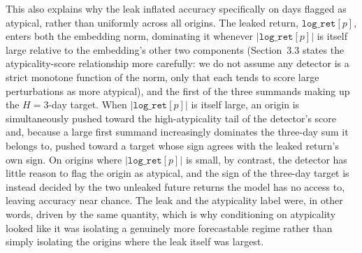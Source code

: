 \documentclass[preprint,12pt]{elsarticle}
\begin{document}
This also explains why the leak inflated accuracy specifically on days flagged as atypical,
rather than uniformly across all origins. The leaked return, $\texttt{log\_ret}[p]$, enters both
the embedding norm, dominating it whenever $|\texttt{log\_ret}[p]|$ is itself large relative to
the embedding's other two components (Section~3.3 states the atypicality-score relationship more
carefully: we do not assume any detector is a strict monotone function of the norm, only that
each tends to score large perturbations as more atypical), and the first of the three
summands making up the $H=3$-day target. When $|\texttt{log\_ret}[p]|$ is itself large, an origin
is simultaneously pushed toward the high-atypicality tail of the detector's score and, because a
large first summand increasingly dominates the three-day sum it belongs to, pushed toward a
target whose sign agrees with the leaked return's own sign. On origins where
$|\texttt{log\_ret}[p]|$ is small, by contrast, the detector has little reason to flag the origin
as atypical, and the sign of the three-day target is instead decided by the two unleaked future
returns the model has no access to, leaving accuracy near chance. The leak and the atypicality
label were, in other words, driven by the same quantity, which is why conditioning on
atypicality looked like it was isolating a genuinely more forecastable regime rather than simply
isolating the origins where the leak itself was largest.
\end{document}
